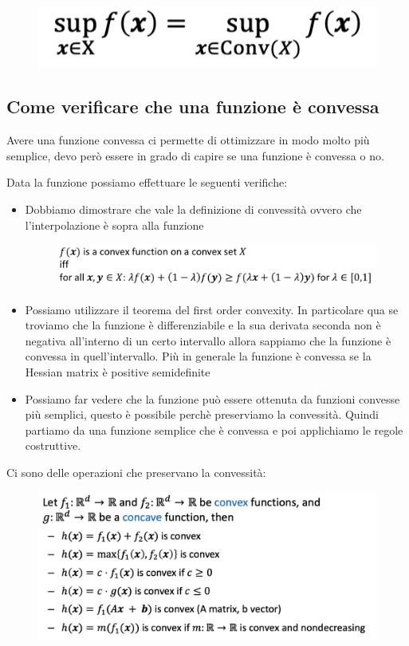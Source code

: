 \documentclass[14pt]{extreport}
\begin{document}
\begin{figure}[H]
\centering
\includegraphics[width=0.7\linewidth]{233.jpeg}
\end{figure}

\subsection{Come verificare che una funzione è convessa}

Avere una funzione convessa ci permette di ottimizzare in modo molto più semplice, devo però essere in grado di capire se una funzione è convessa o
no.

Data la funzione possiamo effettuare le seguenti verifiche:

\begin{itemize}
\item Dobbiamo dimostrare che vale la definizione di convessità ovvero che l'interpolazione è sopra alla funzione
\begin{figure}[H]
\centering
\includegraphics[width=0.7\linewidth]{234.jpeg}
\end{figure}

\item Possiamo utilizzare il teorema del first order convexity. In particolare qua se troviamo che la funzione è differenziabile e la sua derivata
seconda non è negativa all'interno di un certo intervallo allora sappiamo che la funzione è convessa in quell'intervallo. Più in generale la funzione
è convessa se la Hessian matrix è positive semidefinite
\item Possiamo far vedere che la funzione può essere ottenuta da funzioni convesse più semplici, questo è possibile perchè preserviamo la convessità.
Quindi partiamo da una funzione semplice che è convessa e poi applichiamo le regole costruttive.
\end{itemize}

Ci sono delle operazioni che preservano la convessità:

\begin{figure}[H]
\centering
\includegraphics[width=0.7\linewidth]{235.jpeg}
\end{figure}
\end{document}
